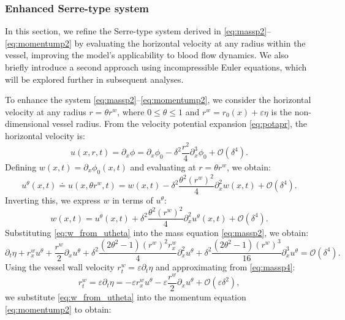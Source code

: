 \documentclass[alpha-refs, 12pt]{wiley-article}
\renewcommand{\O}{\mathcal{O}}
\renewcommand{\leq}{\leqslant}
\newcommand{\eps}{\varepsilon}
\begin{document}
\subsubsection{Enhanced Serre-type system}\label{sec:cbsys}

In this section, we refine the Serre-type system derived in \eqref{eq:massp2}--\eqref{eq:momentump2} by evaluating the horizontal velocity at any radius within the vessel, improving the model's applicability to blood flow dynamics. We also briefly introduce a second approach using incompressible Euler equations, which will be explored further in subsequent analyses.

To enhance the system \eqref{eq:massp2}--\eqref{eq:momentump2}, we consider the horizontal velocity at any radius $r = \theta r^w$, where $0 \leq \theta \leq 1$ and $r^w = r_0(x) + \eps \eta$ is the non-dimensional vessel radius. From the velocity potential expansion \eqref{eq:potapr}, the horizontal velocity is:
\[
  u(x, r, t) = \partial_x \phi = \partial_x \phi_0 - \delta^2 \frac{r^2}{4} \partial_x^3 \phi_0 + \O(\delta^4).
\]
Defining $w(x, t) = \partial_x \phi_0(x, t)$ and evaluating at $r = \theta r^w$, we obtain:
\begin{equation}\label{eq:generalu}
  u^\theta(x, t) \doteq u(x, \theta r^w, t) = w(x, t) - \delta^2 \frac{\theta^2 (r^w)^2}{4} \partial_x^2 w(x, t) + \O(\delta^4).
\end{equation}
Inverting this, we express $w$ in terms of $u^\theta$:
\begin{equation}\label{eq:w_from_utheta}
  w(x, t) = u^\theta(x, t) + \delta^2 \frac{\theta^2 (r^w)^2}{4} \partial_x^2 u^\theta(x, t) + \O(\delta^4).
\end{equation}
Substituting \eqref{eq:w_from_utheta} into the mass equation \eqref{eq:massp2}, we obtain:
\begin{equation}\label{eq:massp4}
  \partial_t \eta + r^w_x u^\theta + \frac{r^w}{2} \partial_x u^\theta + \delta^2 \frac{(2 \theta^2 - 1) (r^w)^2 r^w_x}{4} \partial_x^2 u^\theta + \delta^2 \frac{(2 \theta^2 - 1) (r^w)^3}{16} \partial_x^3 u^\theta = \O(\delta^4).
\end{equation}
Using the vessel wall velocity $r^w_t = \eps \partial_t \eta$ and approximating from \eqref{eq:massp4}:
\begin{equation}\label{eq:rw_t}
  r^w_t = \eps \partial_t \eta = -\eps r^w_x u^\theta - \eps \frac{r^w}{2} \partial_x u^\theta + \O(\eps \delta^2),
\end{equation}
we substitute \eqref{eq:w_from_utheta} into the momentum equation \eqref{eq:momentump2} to obtain:
\end{document}
